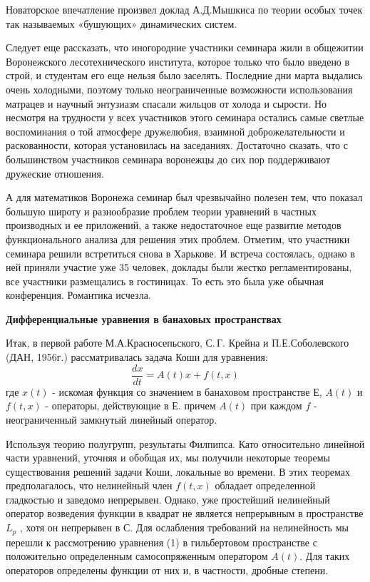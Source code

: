 Новаторское впечатление произвел доклад А.Д.Мышкиса по теории особых точек так называемых «бушующих» динамических систем.

 	Следует еще рассказать, что иногородние участники семинара жили в общежитии Воронежского лесотехнического института, которое только что было введено в строй, и студентам его еще нельзя было заселять. Последние дни марта выдались очень холодными, поэтому только неограниченные возможности использования матрацев и научный энтузиазм спасали жильцов от холода и сырости. Но несмотря на трудности у всех участников этого семинара остались самые светлые воспоминания о той атмосфере дружелюбия, взаимной доброжелательности и раскованности, которая установилась на заседаниях. Достаточно сказать, что с большинством участников семинара воронежцы до сих пор поддерживают дружеские отношения.

А для математиков Воронежа семинар был чрезвычайно полезен тем, что показал большую широту и разнообразие проблем теории уравнений в       частных производных и ее приложений, а также недостаточное еще развитие методов функционального анализа для решения этих проблем.
Отметим, что участники семинара решили встретиться снова в Харькове. И встреча состоялась, однако в ней приняли участие уже 35 человек, доклады были жестко регламентированы, все участники размещались в гостиницах. То есть это была уже обычная конференция. Романтика исчезла.

{\bf Дифференциальные уравнения в банаховых пространствах}

Итак, в первой работе М.А.Красносепьского, С.\,Г. Крейна и П.Е.Соболевского (ДАН, 1956г.) рассматривалась задача Коши для уравнения:
$$\frac{dx}{dt} = A(t)x + f(t, x)$$
где $x(t)$ - искомая функция со значением в банаховом пространстве $Е$, $A(t)$ и $f(t,x)$ - операторы, действующие в $Е$. причем $A(t)$ при каждом $f$ - неограниченный замкнутый линейный оператор.

Используя теорию полугрупп, результаты Филпипса. Като относительно линейной части уравнений, уточняя и обобщая их, мы получили некоторые теоремы существования решений задачи Коши, локальные во времени. В этих теоремах предполагалось, что нелинейный член $f(t,x)$ обладает определенной гладкостью и заведомо непрерывен. Однако, уже простейший нелинейный оператор возведения функции в квадрат не является непрерывным в пространстве $L_p$ , хотя он непрерывен в С. Для ослабления требований на нелинейность мы перешли к рассмотрению уравнения (1) в гильбертовом пространстве с положительно определенным самосопряженным оператором $A(t)$. Для таких операторов определены функции от них и, в частности, дробные степени.

